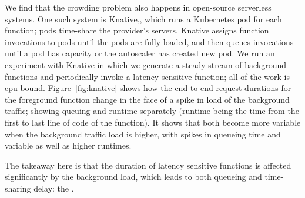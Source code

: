 We find that the crowding problem also happens in open-source serverless
systems. One such system is Knative,\cite{knative}, which runs a Kubernetes pod
for each function; pods time-share the provider's servers. Knative assigns
function invocations to pods until the pods are fully loaded, and then queues
invocations until a pod has capacity or the autoscaler has created new pod. We
run an experiment with Knative in which we generate a steady stream of
background functions and periodically invoke a latency-sensitive function; all
of the work is cpu-bound. Figure~\ref{fig:knative} shows how the end-to-end
request durations for the foreground function change in the face of a spike in
load of the background traffic; showing queuing and runtime separately (runtime
being the time from the first to last line of code of the function). It shows
that both become more variable when the background traffic load is higher, with
spikes in queueing time and variable as well as higher runtimes.

The takeaway here is that the duration of latency sensitive functions is
affected significantly by the background load, which leads to both queueing and
time-sharing delay: the \problem{}.
